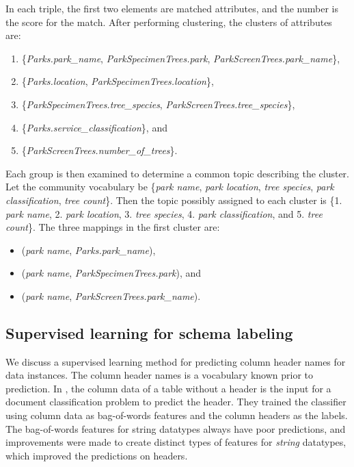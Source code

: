 In each triple, the first two elements are matched attributes, and the number is the score for the match. After performing clustering, the clusters of attributes are:
\begin{enumerate}
	\item \{\textit{Parks.park\_name}, \textit{ParkSpecimenTrees.park}, \textit{ParkScreenTrees.park\_name}\},
	\item \{\textit{Parks.location}, \textit{ParkSpecimenTrees.location}\},
	\item \{\textit{ParkSpecimenTrees.tree\_species}, \textit{ParkScreenTrees.tree\_species}\},
	\item \{\textit{Parks.service\_classification}\}, and
	\item \{\textit{ParkScreenTrees.number\_of\_trees}\}.
\end{enumerate}

Each group is then examined to determine a common topic describing the cluster. Let the community vocabulary be \{\textit{park name}, \textit{park location}, \textit{tree species}, \textit{park classification}, \textit{tree count}\}. Then the topic possibly assigned to each cluster is \{1. \textit{park name}, 2. \textit{park location}, 3. \textit{tree species}, 4. \textit{park classification}, and 5. \textit{tree count}\}. The three mappings in the first cluster are:
\begin{itemize}
	\item[] (\textit{park name}, \textit{Parks.park\_name}),
	\item[] (\textit{park name}, \textit{ParkSpecimenTrees.park}), and
	\item[] (\textit{park name}, \textit{ParkScreenTrees.park\_name}).
\end{itemize}

\subsection{Supervised learning for schema labeling}
\label{ssec:SupervisedLearningForSchemaLabeling}

We discuss a supervised learning method for predicting column header names for data instances. The column header names is a vocabulary known prior to prediction. In \cite{10.1145/3184558.3191601}, the column data of a table without a header is the input for a document classification problem to predict the header. They trained the classifier using column data as bag-of-words features and the column headers as the labels. The bag-of-words features for string datatypes always have poor predictions, and improvements were made to create distinct types of features for \textit{string} datatypes, which improved the predictions on headers.


